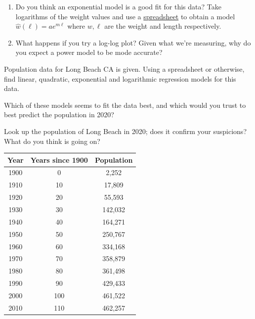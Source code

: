 \begin{exercises}{}{}
\begin{enumerate}
\begin{minipage}[t]{0.54\linewidth}
	\vspace{-5pt}
	\begin{enumerate}
	  \item Do you think an exponential model is a good fit for this data? Take logarithms of the weight values and use a \href{http://math.uci.edu/~ndonalds/math8/fishdata.xlsx}{spreadsheet} to obtain a model $\hat w(\ell)=ae^{m\ell}$ where $w,\ell$ are the weight and length respectively.
	  \item What happens if you try a log-log plot? Given what we're measuring, why do you expect a power model to be mode accurate?
	\end{enumerate}
\end{minipage}
\medbreak
  
  
\begin{minipage}[t]{0.52\linewidth}\vspace{0pt}
   \item Population data for Long Beach CA is given.\smallbreak
   Using a spreadsheet or otherwise, find linear, quadratic, exponential and logarithmic regression models for this data.\par
   Which of these models seems to fit the data best, and which would you trust to best predict the population in 2020?\par
   Look up the population of Long Beach in 2020; does it confirm your suspicions? What do you think is going on?
\end{minipage}
\hfill
\begin{minipage}[t]{0.45\linewidth}\vspace{0pt}
  \flushright\begin{tabular}{c|c|c}
  Year&Years since 1900&Population\\\hline
  1900&0&2,252\\
  1910&10&17,809\\
	1920&20&55,593\\
	1930&30&142,032\\
	1940&40&164,271\\
	1950&50&250,767\\
	1960&60&334,168\\
	1970&70&358,879\\
	1980&80&361,498\\
	1990&90&429,433\\
	2000&100&461,522\\
	2010&110&462,257%
  \end{tabular}
\end{minipage}
  

\end{enumerate}
\end{exercises}
